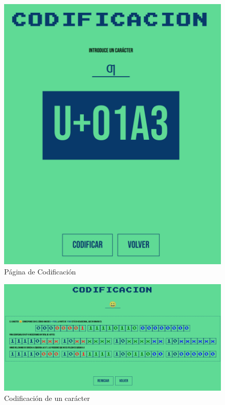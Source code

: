 \documentclass{article}
\begin{document}
\begin{figure}[h]
  \centering
  \includegraphics[width=1.0\textwidth]{codificacion.png}
  \caption{Página de Codificación}
  \label{fig:codificacion}
\end{figure}

\begin{figure}[h]
  \centering
  \includegraphics[width=1.0\textwidth]{codificacion-ejemplo.png}
  \caption{Codificación de un carácter}
  \label{fig:codificacion-ejemplo}
\end{figure}
\end{document}
